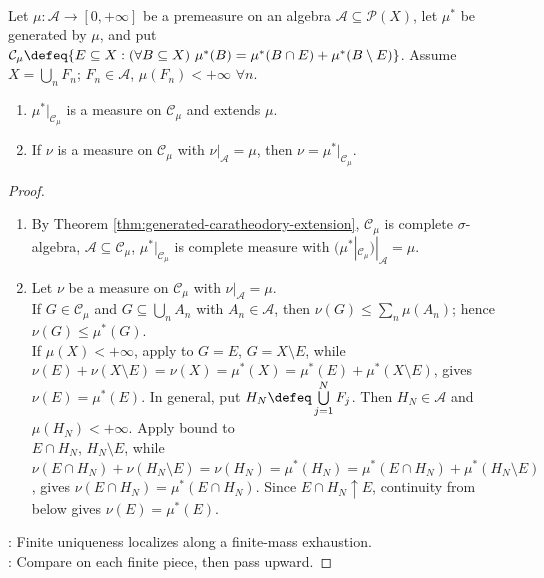 \begin{theorem} \label{thm:sigma-finite-generated-extension-uniqueness} \\
Let $\mu:\mathcal{A}\to[0,+\infty]$ be a premeasure on an algebra $\mathcal{A}\subseteq\mathcal{P}(X)$, let $\mu^\ast$ be generated by $\mu$, and put\\
$\mathcal{C}_\mu\defeq\{E\subseteq X:(\forall B\subseteq X)\ \mu^\ast(B)=\mu^\ast(B\cap E)+\mu^\ast(B\setminus E)\}$. Assume $X=\bigcup\limits_nF_n$; $F_n\in\mathcal{A}$, $\mu(F_n)<+\infty$ $\forall n$.
\begin{enumerate}[label=(\roman*)]
\setlength{\itemsep}{0pt}
\item $\mu^\ast|_{\mathcal{C}_\mu}$ is a measure on $\mathcal{C}_\mu$ and extends $\mu$.
\item If $\nu$ is a measure on $\mathcal{C}_\mu$ with $\nu|_{\mathcal{A}}=\mu$, then $\nu=\mu^\ast|_{\mathcal{C}_\mu}$.
\end{enumerate}
\begin{proof}
\begin{enumerate}[label=(\roman*)]
\setlength{\itemsep}{0pt}
\item By Theorem \ref{thm:generated-caratheodory-extension}, $\mathcal{C}_\mu$ is complete $\sigma$-algebra, $\mathcal{A}\subseteq\mathcal{C}_\mu$, $\mu^\ast|_{\mathcal{C}_\mu}$ is complete measure with $(\mu^\ast|_{\mathcal{C}_\mu})|_{\mathcal{A}}=\mu$.
\item Let $\nu$ be a measure on $\mathcal{C}_\mu$ with $\nu|_{\mathcal{A}}=\mu$.\\
If $G\in\mathcal{C}_\mu$ and $G\subseteq\bigcup\limits_nA_n$ with $A_n\in\mathcal{A}$, then $\nu(G)\leq\sum\limits_n\mu(A_n)$; hence $\nu(G)\leq\mu^\ast(G)$.\\
If $\mu(X)<+\infty$, apply to $G=E$, $G=X\setminus E$, while $\nu(E)+\nu(X\setminus E)=\nu(X)=\mu^\ast(X)=\mu^\ast(E)+\mu^\ast(X\setminus E)$, gives $\nu(E)=\mu^\ast(E)$. In general, put $H_N\defeq\bigcup\limits_{j=1}^{N}F_j$. Then $H_N\in\mathcal{A}$ and $\mu(H_N)<+\infty$. Apply bound to\\
$E\cap H_N$, $H_N\setminus E$, while $\nu(E\cap H_N)+\nu(H_N\setminus E)=\nu(H_N)=\mu^\ast(H_N)=\mu^\ast(E\cap H_N)+\mu^\ast(H_N\setminus E)$, gives $\nu(E\cap H_N)=\mu^\ast(E\cap H_N)$. Since $E\cap H_N\uparrow E$, continuity from below gives $\nu(E)=\mu^\ast(E)$.
\end{enumerate}
: Finite uniqueness localizes along a finite-mass exhaustion.\\
: Compare on each finite piece, then pass upward.
\end{proof}
\end{theorem}

